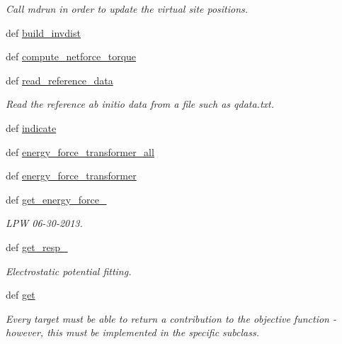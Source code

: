 \begin{DoxyCompactItemize}
\begin{DoxyCompactList}\small\item\em \-Call mdrun in order to update the virtual site positions. \end{DoxyCompactList}\item 
def \hyperlink{classforcebalance_1_1abinitio_1_1AbInitio_a7475857193eefd4edd020d4f2a8fec17}{build\-\_\-invdist}
\item 
def \hyperlink{classforcebalance_1_1abinitio_1_1AbInitio_afbf86c26158a68cae7460b4106809fdd}{compute\-\_\-netforce\-\_\-torque}
\item 
def \hyperlink{classforcebalance_1_1abinitio_1_1AbInitio_aa73bedbf1e2cf19f2fa1e88815f1bd86}{read\-\_\-reference\-\_\-data}
\begin{DoxyCompactList}\small\item\em \-Read the reference ab initio data from a file such as qdata.\-txt. \end{DoxyCompactList}\item 
def \hyperlink{classforcebalance_1_1abinitio_1_1AbInitio_a3260db78e8c174f04a64661c4e5c181c}{indicate}
\item 
def \hyperlink{classforcebalance_1_1abinitio_1_1AbInitio_a3d28520925c6dfd179647d0abf7e1368}{energy\-\_\-force\-\_\-transformer\-\_\-all}
\item 
def \hyperlink{classforcebalance_1_1abinitio_1_1AbInitio_a9167da321a9fff748eef5ebe754cc7ca}{energy\-\_\-force\-\_\-transformer}
\item 
def \hyperlink{classforcebalance_1_1abinitio_1_1AbInitio_a313c848f46579817803c8a3ff100974e}{get\-\_\-energy\-\_\-force\-\_\-}
\begin{DoxyCompactList}\small\item\em \-L\-P\-W 06-\/30-\/2013. \end{DoxyCompactList}\item 
def \hyperlink{classforcebalance_1_1abinitio_1_1AbInitio_abfe50569805218075c5942fd3be8bbe7}{get\-\_\-resp\-\_\-}
\begin{DoxyCompactList}\small\item\em \-Electrostatic potential fitting. \end{DoxyCompactList}\item 
def \hyperlink{classforcebalance_1_1abinitio_1_1AbInitio_a2bb3ed7209707f688ec8b731392466b5}{get}
\begin{DoxyCompactList}\small\item\em \-Every target must be able to return a contribution to the objective function -\/ however, this must be implemented in the specific subclass. \end{DoxyCompactList}\item 

\end{DoxyCompactItemize}
